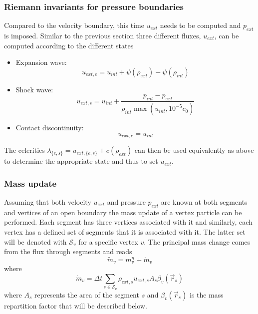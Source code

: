\documentclass{../GPUSPHtemplate}
\begin{document}
\subsubsection{Riemann invariants for pressure boundaries}
\label{h:open:pres}
Compared to the velocity boundary, this time $u_{ext}$ needs to be
computed and $p_{ext}$ is imposed. Similar to the previous section three
different fluxes, $u_{ext}$, can be computed according to the different
states
\begin{itemize}
\item Expansion wave:
\begin{equation}
u_{ext,e} = u_{int} + \psi(\rho_{ext}) - \psi(\rho_{int})
\label{e:open:pexp}
\end{equation}
\item Shock wave:
\begin{equation}
u_{ext,s} = u_{int} + \frac{p_{int} - p_{ext}}{\rho_{int}\max(u_{int},
10^{-5}c_0)}
\label{e:open:pshock}
\end{equation}
\item Contact discontinuity:
\begin{equation}
u_{ext,c} = u_{int}
\label{e:open:pcontact}
\end{equation}
\end{itemize}
The celerities $\lambda_{\{e,s\}} = u_{ext,\{e,s\}} + c(\rho_{ext})$ can
then be used equivalently as above to determine the appropriate state
and thus to set $u_{ext}$.

\subsubsection{Mass update}
Assuming that both velocity $u_{ext}$ and pressure $p_{ext}$ are known
at both segments and vertices of an open boundary the mass update of a
vertex particle can be performed. Each segment has three vertices
associated with it and similarly, each vertex has a defined set of
segments that it is associated with it. The latter set will be denoted
with $\mathcal{S}_v$ for a specific vertex $v$. The principal mass
change comes from the flux through segments and reads
\begin{equation}
\widetilde{m}_v = m^n_v + \dot{m}_v
\label{e:open:mtilde}
\end{equation}
where
\begin{equation}
\dot{m}_v = \Delta t \underset{s \in \mathcal{S}_v}{\sum}
\rho_{ext,s} u_{ext,s} A_s \beta_v(\vec{r}_s)
\label{e:open:mdot}
\end{equation}
where $A_s$ represents the area of the segment $s$ and
$\beta_v(\vec{r}_s)$ is the mass repartition factor that will be
described below.
\end{document}
